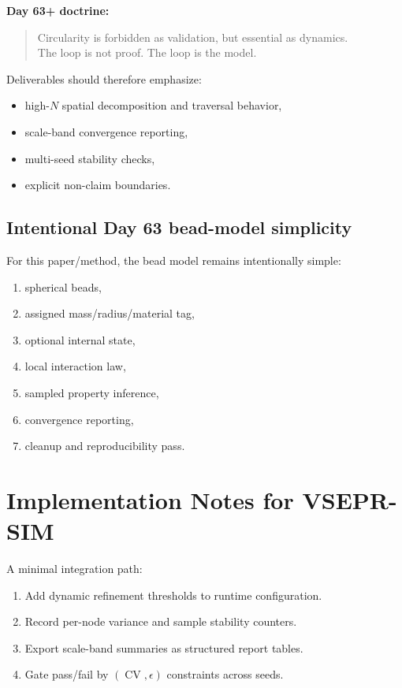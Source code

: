 \documentclass[11pt, a4paper, oneside]{article}
\DeclareMathOperator{\CV}{CV}
\begin{document}
\noindent\textbf{Day 63+ doctrine:}
\begin{quote}
Circularity is forbidden as validation, but essential as dynamics.\\
The loop is not proof. The loop is the model.
\end{quote}

Deliverables should therefore emphasize:
\begin{itemize}
  \item high-$N$ spatial decomposition and traversal behavior,
  \item scale-band convergence reporting,
  \item multi-seed stability checks,
  \item explicit non-claim boundaries.
\end{itemize}

\subsection{Intentional Day 63 bead-model simplicity}

For this paper/method, the bead model remains intentionally simple:
\begin{enumerate}
  \item spherical beads,
  \item assigned mass/radius/material tag,
  \item optional internal state,
  \item local interaction law,
  \item sampled property inference,
  \item convergence reporting,
  \item cleanup and reproducibility pass.
\end{enumerate}

\section{Implementation Notes for VSEPR-SIM}

A minimal integration path:
\begin{enumerate}
  \item Add dynamic refinement thresholds to runtime configuration.
  \item Record per-node variance and sample stability counters.
  \item Export scale-band summaries as structured report tables.
  \item Gate pass/fail by $(\CV,\epsilon)$ constraints across seeds.
\end{enumerate}
\end{document}

